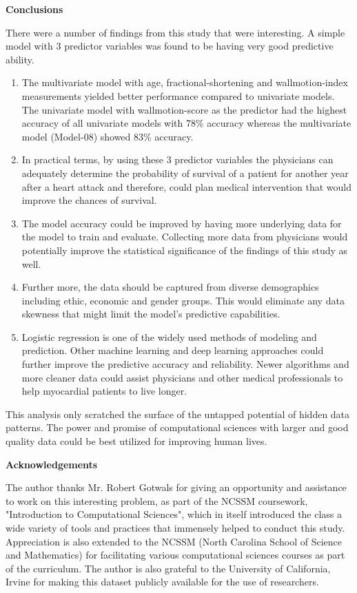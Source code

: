 \documentclass[11pt]{article}
\begin{document}
\newpage
{\bf Conclusions}

There were a number of findings from this study that were interesting. A simple model with 3 predictor variables was found to be having very good predictive ability.
\begin{enumerate}
  \item The multivariate model with age, fractional-shortening and wallmotion-index measurements yielded better performance compared to univariate models. The univariate model with wallmotion-score as the predictor had the highest accuracy of all univariate models with 78\% accuracy whereas the multivariate model (Model-08) showed 83\% accuracy.
  \item In practical terms, by using these 3 predictor variables the physicians can adequately determine the probability of survival of a patient for another year after a heart attack and therefore, could plan medical intervention that would improve the chances of survival.
  \item The model accuracy could be improved by having more underlying data for the model to train and evaluate. Collecting more data from physicians would potentially improve the statistical significance of the findings of this study as well.
  \item Further more, the data should be captured from diverse demographics including ethic, economic and gender groups. This would eliminate any data skewness that might limit the model's predictive capabilities.
  \item Logistic regression is one of the widely used methods of modeling and prediction. Other machine learning and deep learning approaches could further improve the predictive accuracy and reliability. Newer algorithms and more cleaner data could assist physicians and other medical professionals to help myocardial patients to live longer.
\end{enumerate}

This analysis only scratched the surface of the untapped potential of hidden data patterns. The power and promise of computational sciences with larger and good quality data could be best utilized for improving human lives.

{\bf Acknowledgements}

The author thanks Mr. Robert Gotwals for giving an opportunity and assistance to work on this interesting problem, as part of the NCSSM coursework, "Introduction to Computational Sciences", which in itself introduced the class a wide variety of tools and practices that immensely helped to conduct this study.  Appreciation is also extended to the NCSSM (North Carolina School of Science and Mathematics) for facilitating various computational sciences courses as part of the curriculum. The author is also grateful to the University of California, Irvine for making this dataset publicly available for the use of researchers.
\end{document}

